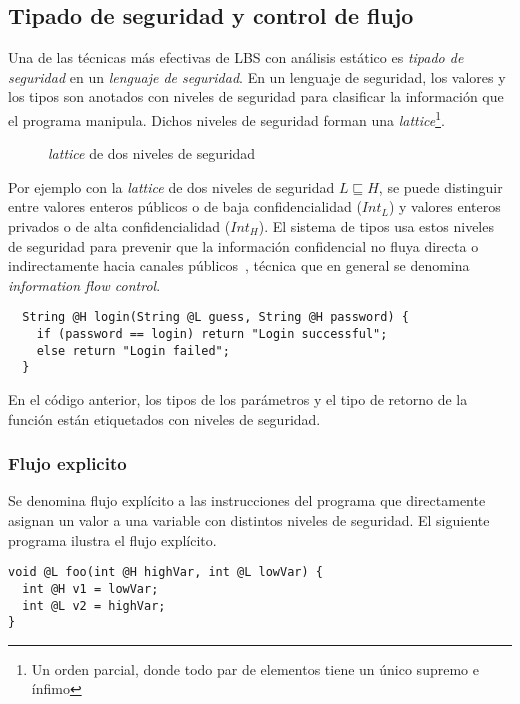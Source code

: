 \subsection{Tipado de seguridad y control de flujo} \label{sectype}
Una de las técnicas más efectivas de LBS con análisis estático es \textit{tipado de seguridad} en un \textit{lenguaje de seguridad}. En un lenguaje de seguridad, los valores y los tipos son anotados con niveles de seguridad para clasificar la información que el programa manipula. Dichos niveles de seguridad forman una \textit{lattice}\footnote{Un orden parcial, donde todo par de elementos tiene un único supremo e ínfimo}.

	\begin{figure}[ht]
		\centering
		\caption{\textit{lattice} de dos niveles de seguridad}
	\end{figure}


  	Por ejemplo con la \textit{lattice} de dos niveles de seguridad $L \sqsubseteq H$, se puede distinguir entre valores enteros públicos o de baja confidencialidad ($Int_L$) y valores enteros privados o de alta confidencialidad ($Int_H$). El sistema de tipos usa estos niveles de seguridad para prevenir que la información confidencial no fluya directa o indirectamente hacia canales públicos~\cite{volpanoAl:S96}, técnica que en general se denomina \textit{information flow control}.

  	\begin{lstlisting}
  String @H login(String @L guess, String @H password) {
  	if (password == login) return "Login successful";
  	else return "Login failed";
  }
  	\end{lstlisting}

    En el código anterior, los tipos de los parámetros y el tipo de retorno de la función están etiquetados con niveles de seguridad.

\subsubsection{Flujo explicito}
Se denomina flujo explícito a las instrucciones del programa que directamente asignan un valor a una variable con distintos niveles de seguridad. El siguiente programa ilustra el flujo explícito.

\begin{lstlisting}
void @L foo(int @H highVar, int @L lowVar) {
  int @H v1 = lowVar;
  int @L v2 = highVar;
}
\end{lstlisting}

